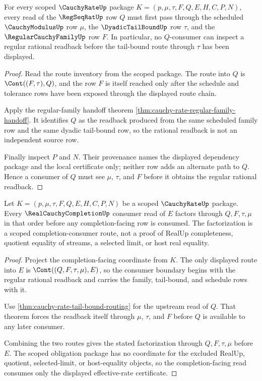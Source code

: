 \begin{theorem}
\label{thm:cauchy-rate-tail-bound-routing}
For every scoped $\CauchyRateUp$ package $K=(p,\mu,\tau,F,Q,E,H,C,P,N)$, every read of the $\RegSeqRatUp$ row $Q$ must first pass through the scheduled $\CauchyModulusUp$ row $\mu$, the $\DyadicTailBoundUp$ row $\tau$, and the $\RegularCauchyFamilyUp$ row $F$. In particular, no $Q$-consumer can inspect a regular rational readback before the tail-bound route through $\tau$ has been displayed.
\end{theorem}
\begin{proof}
Read the route inventory from the scoped package. The route into $Q$ is $\Cont((F,\tau),Q)$, and the row $F$ is itself reached only after the schedule and tolerance rows have been exposed through the displayed route chain.

Apply the regular-family handoff theorem \autoref{thm:cauchy-rate-regular-family-handoff}. It identifies $Q$ as the readback produced from the same scheduled family row and the same dyadic tail-bound row, so the rational readback is not an independent source row.

Finally inspect $P$ and $N$. Their provenance names the displayed dependency package and the local certificate only; neither row adds an alternate path to $Q$. Hence a consumer of $Q$ must see $\mu$, $\tau$, and $F$ before it obtains the regular rational readback.
\end{proof}

\begin{theorem}
\label{thm:cauchy-rate-real-seal-consumption}
Let $K=(p,\mu,\tau,F,Q,E,H,C,P,N)$ be a scoped $\CauchyRateUp$ package. Every $\RealCauchyCompletionUp$ consumer read of $E$ factors through $Q,F,\tau,\mu$ in that order before any completion-facing row is consumed. The factorization is a scoped completion-consumer route, not a proof of RealUp completeness, quotient equality of streams, a selected limit, or host real equality.
\end{theorem}
\begin{proof}
Project the completion-facing coordinate from $K$. The only displayed route into $E$ is $\Cont((Q,F,\tau,\mu),E)$, so the consumer boundary begins with the regular rational readback and carries the family, tail-bound, and schedule rows with it.

Use \autoref{thm:cauchy-rate-tail-bound-routing} for the upstream read of $Q$. That theorem forces the readback itself through $\mu$, $\tau$, and $F$ before $Q$ is available to any later consumer.

Combining the two routes gives the stated factorization through $Q,F,\tau,\mu$ before $E$. The scoped obligation package has no coordinate for the excluded RealUp, quotient, selected-limit, or host-equality objects, so the completion-facing read consumes only the displayed effective-rate certificate.
\end{proof}


